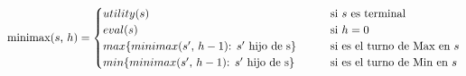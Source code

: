 \documentclass[preview]{standalone}
\begin{document}
\begin{align*}
\text{minimax($s$, $h$)} =  \begin{cases}
                                 utility(s) \qquad &\text{si $s$ es terminal} \cr
                                 eval(s) \qquad &\text{si $h = 0$} \cr
                                 max\{minimax(\text{$s'$, $h-1$): $s'$ hijo de }$s$\}\qquad &\text{si es el turno de Max en $s$} \cr
                                 min\{minimax(\text{$s'$, $h-1$): $s'$ hijo de }$s$\}\qquad &\text{si es el turno de Min en $s$} \cr
                                 \end{cases}
\end{align*}
\end{document}

